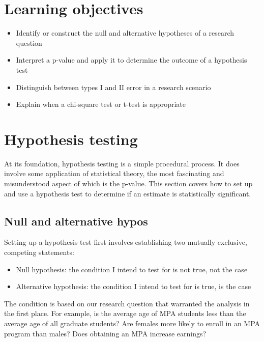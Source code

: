 \documentclass[
]{book}
\providecommand{\tightlist}{%
  \setlength{\itemsep}{0pt}\setlength{\parskip}{0pt}}
\begin{document}
\hypertarget{lo11}{%
\section{Learning objectives}\label{lo11}}

\begin{itemize}
\tightlist
\item
  Identify or construct the null and alternative hypotheses of a research question
\item
  Interpret a p-value and apply it to determine the outcome of a hypothesis test
\item
  Distinguish between types I and II error in a research scenario
\item
  Explain when a chi-square test or t-test is appropriate
\end{itemize}

\hypertarget{hypothesis-testing-1}{%
\section{Hypothesis testing}\label{hypothesis-testing-1}}

At its foundation, hypothesis testing is a simple procedural process. It does involve some application of statistical theory, the most fascinating and misunderstood aspect of which is the p-value. This section covers how to set up and use a hypothesis test to determine if an estimate is statistically significant.

\hypertarget{null-and-alternative-hypos}{%
\subsection{Null and alternative hypos}\label{null-and-alternative-hypos}}

Setting up a hypothesis test first involves establishing two mutually exclusive, competing statements:

\begin{itemize}
\tightlist
\item
  Null hypothesis: the condition I intend to test for is not true, not the case
\item
  Alternative hypothesis: the condition I intend to test for is true, is the case
\end{itemize}

The condition is based on our research question that warranted the analysis in the first place. For example, is the average age of MPA students less than the average age of all graduate students? Are females more likely to enroll in an MPA program than males? Does obtaining an MPA increase earnings?
\end{document}
